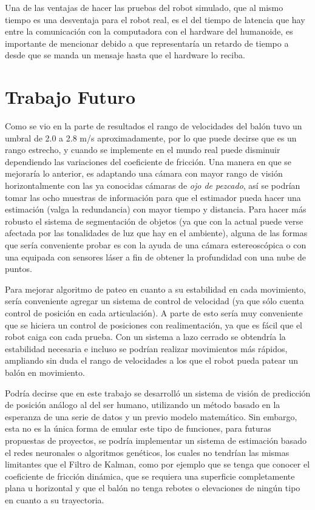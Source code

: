 	Una de las ventajas de hacer las pruebas del robot simulado, que al mismo tiempo es una desventaja para el robot real, es el del tiempo de latencia que hay entre la comunicación con la computadora con el hardware del humanoide, es importante de mencionar debido a que representaría un retardo de tiempo a desde que se manda un mensaje hasta que el hardware lo reciba. 
	

	
\section{Trabajo Futuro}
	Como se vio en la parte de resultados el rango de velocidades del balón tuvo un umbral de 2.0 a 2.8 m/s aproximadamente, por lo que puede decirse que es un rango estrecho, y cuando se implemente en el mundo real puede disminuir dependiendo las variaciones del coeficiente de fricción. Una manera en que se mejoraría lo anterior, es adaptando una cámara con mayor rango de visión horizontalmente con las ya conocidas cámaras de \textit{ojo de pezcado}, así se podrían tomar las ocho muestras de información para que el estimador pueda hacer una estimación (valga la redundancia) con mayor tiempo y distancia. Para hacer más robusto el sistema de segmentación de objetos (ya que con la actual puede verse afectada por las tonalidades de luz que hay en el ambiente), alguna de las formas que sería conveniente probar es con la ayuda de una cámara estereoscópica o con una equipada con sensores láser a fin de obtener la profundidad con una nube de puntos.

	Para mejorar algoritmo de pateo en cuanto a su estabilidad en cada movimiento, sería conveniente agregar un sistema de control de velocidad (ya que sólo cuenta control de posición en cada articulación). A parte de esto sería muy conveniente que se hiciera un control de posiciones con realimentación, ya que es fácil que el robot caiga con cada prueba. Con un sistema a lazo cerrado se obtendría la estabilidad necesaria e incluso se podrían realizar movimientos más rápidos, ampliando sin duda el rango de velocidades a los que el robot pueda patear un balón en movimiento. 
		
	Podría decirse que en este trabajo se desarrolló un sistema de visión de predicción de posición análogo al del ser humano, utilizando un método basado en la esperanza de una serie de datos y un previo modelo matemático. Sin embargo, esta no es la única forma de emular este tipo de funciones, para futuras propuestas de proyectos, se podría implementar un sistema de estimación basado el redes neuronales o algoritmos genéticos, los cuales no tendrían las mismas limitantes que el Filtro de Kalman, como por ejemplo que se tenga que conocer el coeficiente de fricción dinámica, que se requiera una superficie completamente plana u horizontal y que el balón no tenga rebotes o elevaciones de ningún tipo en cuanto a su trayectoria.

